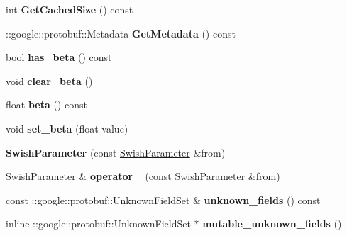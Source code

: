 \begin{DoxyCompactItemize}
int {\bfseries Get\+Cached\+Size} () const
\item 
\mbox{\label{classcaffe_1_1_swish_parameter_aa350e1a8c7a607766884b68ea7a1ee1e}} 
\+::google\+::protobuf\+::\+Metadata {\bfseries Get\+Metadata} () const
\item 
\mbox{\label{classcaffe_1_1_swish_parameter_a647a575cc13cd5bef7002afd602fea7e}} 
bool {\bfseries has\+\_\+beta} () const
\item 
\mbox{\label{classcaffe_1_1_swish_parameter_a9bf228e804bf95188881c3274a4b8417}} 
void {\bfseries clear\+\_\+beta} ()
\item 
\mbox{\label{classcaffe_1_1_swish_parameter_af5f916af9c8855a14fb852bdc0ff2895}} 
float {\bfseries beta} () const
\item 
\mbox{\label{classcaffe_1_1_swish_parameter_ac1b090548ba9e60da213de3cf0e4a972}} 
void {\bfseries set\+\_\+beta} (float value)
\item 
\mbox{\label{classcaffe_1_1_swish_parameter_a414524eb1952a15952235026940faf90}} 
{\bfseries Swish\+Parameter} (const \mbox{\hyperlink{classcaffe_1_1_swish_parameter}{Swish\+Parameter}} \&from)
\item 
\mbox{\label{classcaffe_1_1_swish_parameter_a3e0e998dabe0159213c508939abb140e}} 
\mbox{\hyperlink{classcaffe_1_1_swish_parameter}{Swish\+Parameter}} \& {\bfseries operator=} (const \mbox{\hyperlink{classcaffe_1_1_swish_parameter}{Swish\+Parameter}} \&from)
\item 
\mbox{\label{classcaffe_1_1_swish_parameter_a47c4c4ea0861d0933cf99080b140edb9}} 
const \+::google\+::protobuf\+::\+Unknown\+Field\+Set \& {\bfseries unknown\+\_\+fields} () const
\item 
\mbox{\label{classcaffe_1_1_swish_parameter_a2bf60e5e74516ca58c290c15c49b6103}} 
inline \+::google\+::protobuf\+::\+Unknown\+Field\+Set $\ast$ {\bfseries mutable\+\_\+unknown\+\_\+fields} ()

\end{DoxyCompactItemize}
